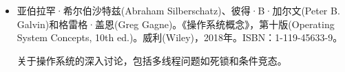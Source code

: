 \begin{itemize}
\item
亚伯拉罕·希尔伯沙特兹(Abraham Silberschatz)、彼得·B·加尔文(Peter B. Galvin)和格雷格·盖恩(Greg Gagne)。《操作系统概念》，第十版(Operating System Concepts, 10th ed.)。威利(Wiley)，2018年。ISBN：1-119-45633-9。

\hspace*{\fill}

关于操作系统的深入讨论，包括多线程问题如死锁和条件竞态。
\end{itemize}